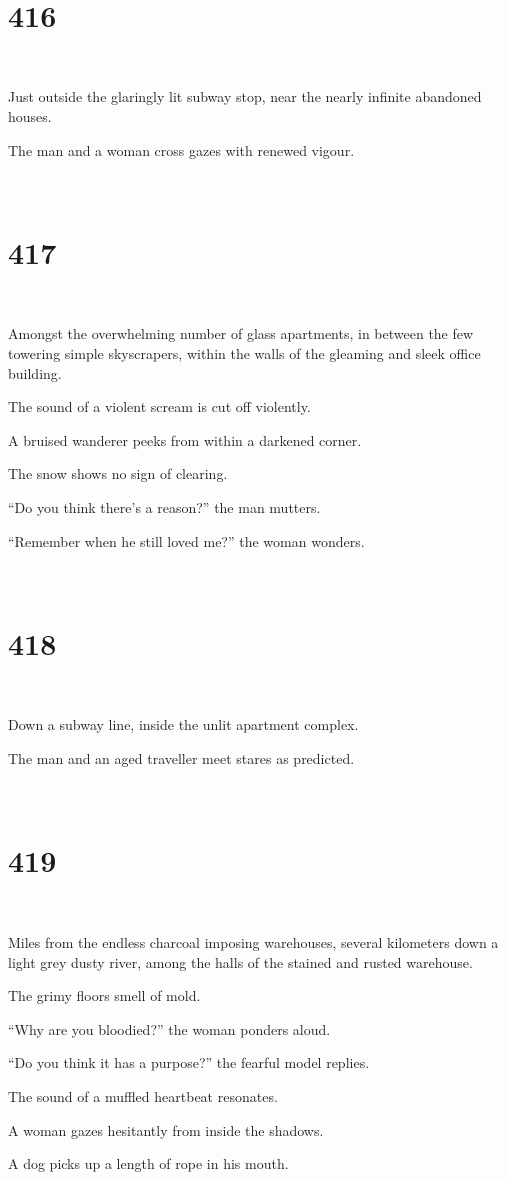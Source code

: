 \documentclass{report}
\begin{document}
~
\chapter*{416}
~

Just outside the glaringly lit subway stop, near the nearly infinite abandoned houses.

The man and a woman cross gazes with renewed vigour.

~
\chapter*{417}
~

Amongst the overwhelming number of glass apartments, in between the few towering simple skyscrapers, within the walls of the gleaming and sleek office building.

The sound of a violent scream is cut off violently.

A bruised wanderer peeks from within a darkened corner.

The snow shows no sign of clearing.

``Do you think there's a reason?'' the man mutters.

``Remember when he still loved me?'' the woman wonders.

~
\chapter*{418}
~

Down a subway line, inside the unlit apartment complex.

The man and an aged traveller meet stares as predicted.

~
\chapter*{419}
~

Miles from the endless charcoal imposing warehouses, several kilometers down a light grey dusty river, among the halls of the stained and rusted warehouse.

The grimy floors smell of mold.

``Why are you bloodied?'' the woman ponders aloud.

``Do you think it has a purpose?'' the fearful model replies.

The sound of a muffled heartbeat resonates.

A woman gazes hesitantly from inside the shadows.

A dog picks up a length of rope in his mouth.
\end{document}
